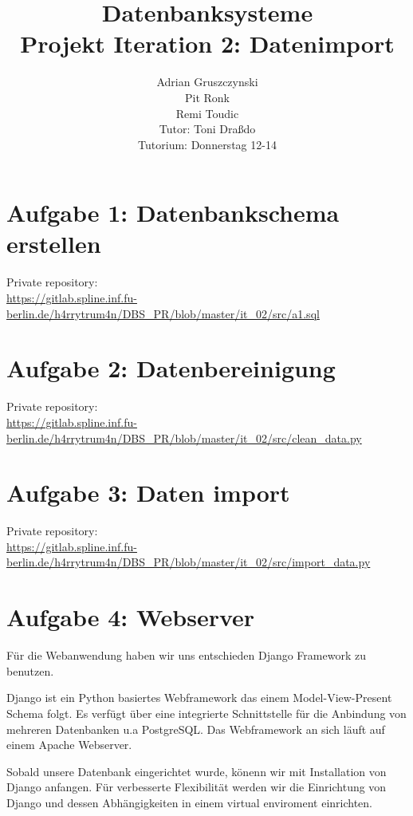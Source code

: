 \documentclass[12pt]{article}
\title{Datenbanksysteme\\
			 Projekt Iteration 2: Datenimport}
\author{Adrian Gruszczynski\\ 
			Pit Ronk\\ %
			Remi Toudic\\ %
		Tutor: Toni Draßdo\\
		Tutorium: Donnerstag 12-14}
\begin{document}
\maketitle
\section*{Aufgabe 1: Datenbankschema erstellen}

Private repository: \\
\url{https://gitlab.spline.inf.fu-berlin.de/h4rrytrum4n/DBS_PR/blob/master/it_02/src/a1.sql}
\newpage
\section*{Aufgabe 2: Datenbereinigung}

Private repository: \\
\url{https://gitlab.spline.inf.fu-berlin.de/h4rrytrum4n/DBS_PR/blob/master/it_02/src/clean_data.py}
\newpage
\section*{Aufgabe 3: Daten import}

Private repository: \\
\url{https://gitlab.spline.inf.fu-berlin.de/h4rrytrum4n/DBS_PR/blob/master/it_02/src/import_data.py}

\section*{Aufgabe 4: Webserver}
Für die Webanwendung haben wir uns entschieden Django Framework zu benutzen. 

Django ist ein Python basiertes Webframework das einem Model-View-Present Schema folgt.
Es verfügt über eine integrierte Schnittstelle für die Anbindung von mehreren Datenbanken u.a PostgreSQL.
Das Webframework an sich läuft auf einem Apache Webserver.

Sobald unsere Datenbank eingerichtet wurde, könenn wir mit Installation von Django anfangen. Für verbesserte Flexibilität werden wir die Einrichtung von Django und dessen Abhängigkeiten in einem virtual enviroment einrichten.
\end{document}
